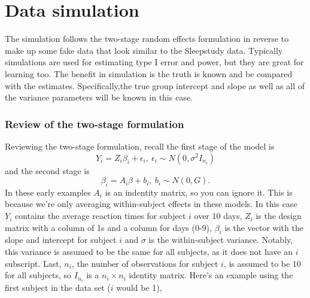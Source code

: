 \documentclass[
]{book}
\begin{document}
\hypertarget{data-simulation}{%
\section*{Data simulation}\label{data-simulation}}

The simulation follows the two-stage random effects formulation in reverse to make up some fake data that look similar to the Sleepstudy data. Typically simulations are used for estimating type I error and power, but they are great for learning too. The benefit in simulation is the truth is known and be compared with the estimates. Specifically,the true group intercept and slope as well as all of the variance parameters will be known in this case.

\hypertarget{review-of-the-two-stage-formulation}{%
\subsubsection*{Review of the two-stage formulation}\label{review-of-the-two-stage-formulation}}

Reviewing the two-stage formulation, recall the first stage of the model is \[Y_i = Z_i\beta_i + \epsilon_i, \: \epsilon_i\sim N(0, \sigma^2I_{n_i})\] and the second stage is \[\beta_i = A_i \beta + b_i, \: b_i \sim N(0,G).\] In these early examples \(A_i\) is an indentity matrix, so you can ignore it. This is because we're only averaging within-subject effects in these models. In this case \(Y_i\) contains the average reaction times for subject \(i\) over 10 days, \(Z_i\) is the design matrix with a column of 1s and a column for days (0-9), \(\beta_i\) is the vector with the slope and intercept for subject \(i\) and \(\sigma\) is the within-subject variance. Notably, this variance is assumed to be the same for all subjects, as it does not have an \(i\) subscript. Last, \(n_i\), the number of observations for subject \(i\), is assumed to be 10 for all subjects, so \(I_{n_i}\) is a \(n_i\times n_i\) identity matrix. Here's an example using the first subject in the data set (\(i\) would be 1),
\end{document}
